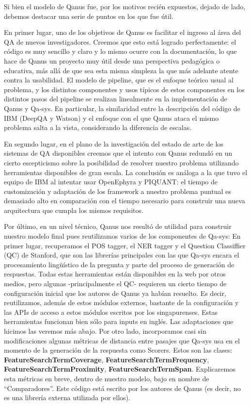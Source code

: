 \bigskip

Si bien el modelo de Qanus fue, por los motivos reci\'en expuestos,
dejado de lado, debemos destacar una serie de puntos en los que fue
\'util.

En primer lugar, uno de los objetivos de Qanus es facilitar el ingreso
al \'area del QA de nuevos investigadores. Creemos que esto est\'a
logrado perfectamente: el c\'odigo es muy sencillo y claro y lo mismo
ocurre con la documentaci\'on, lo que hace de Qanus un proyecto muy
\'util desde una perspectiva pedag\'ogica o educativa, m\'as all\'a de
que sea esta misma simpleza la que m\'as adelante atente contra la
usabilidad. El modelo de pipeline, que es el enfoque te\'orico usual al
problema, y los distintos componentes y usos t\'ipicos de estos
componentes en los distintos pasos del pipeline se realizan linealmente
en la implementaci\'on de Qanus y Qa-sys. En particular, la similaridad
entre la descripci\'on del c\'odigo de IBM (DeepQA y Watson) y el
enfoque con el que Qanus ataca el mismo problema salta a la vista,
considerando la diferencia de escalas. 

En segundo lugar, en el plano de la investigaci\'on del estado de arte
de los sistemas de QA disponibles creemos que el intento con Qanus
redund\'o en un cierto escepticismo sobre la posibilidad de resolver
nuestro problema utilizando herramientas disponibles de gran escala. La
conclusi\'on es an\'aloga a la que tuvo el equipo de IBM al intentar
usar OpenEphyra y PIQUANT: el tiempo de customizaci\'on y adaptaci\'on
de los framework a nuestro problema puntual es demasiado alto en
comparaci\'on con el tiempo necesario para construir una nueva
arquitectura que cumpla los mismos requisitos. 

Por \'ultimo, en un nivel t\'ecnico, Qanus nos result\'o de utilidad para
construir nuestro modelo final pues reutilizamos varios de los
componentes de Qa-sys: En primer lugar, recuperamos el POS tagger, el
NER tagger y el Question Classiffier (QC) de Stanford, que son las
librer\'ias principales con las que Qa-sys encara el procesamiento
ling\"u\'istico de la pregunta y parte del proceso de generaci\'on de
respuestas. Todas estas herramientas est\'an disponibles en la web por
otros medios, pero algunas -principalmente el QC- requieren un cierto
tiempo de configuraci\'on inicial que los autores de Qanus ya hab\'ian
resuelto. Es decir, reutilizamos, adem\'as de estos m\'odulos externos,
bastante de la configuraci\'on y las APIs de acceso a estos m\'odulos
escritos por los singapurenses. Estas herramientas funcionan bien
s\'olo para inputs en ingl\'es. Las adaptaciones que hicimos las
veremos m\'as abajo. Por otro lado, incorporamos casi sin
modificaciones algunas m\'etricas de distancia entre pasajes que Qa-sys
usa en el momento de la generaci\'on de la respuesta como Scorers.
Estos son las clases: \textbf{FeatureSearchTermCoverage},
\textbf{FeatureSearchTermFrequency}, \textbf{FeatureSearchTermProximity},
\textbf{FeatureSearchTermSpan}. Explicaremos esta m\'etricas en breve, dentro de nuestro
modelo, bajo en nombre de
{\textquotedblleft}Comparadores{\textquotedblright}. Este c\'odigo
est\'a escrito por los autores de Qanus (es decir, no es una librer\'ia externa utilizada por ellos).



